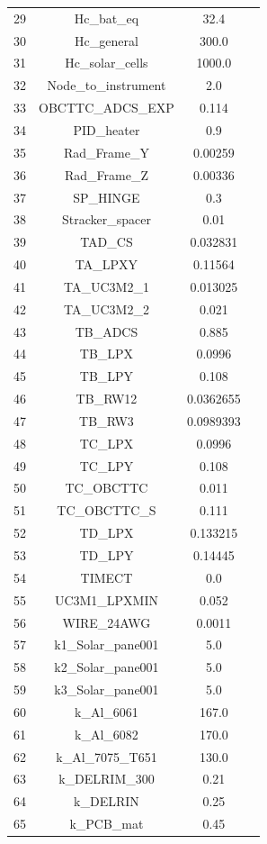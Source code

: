 \begin{table}[H]
\begin{tabular}{cccc}
        29 & Hc\_bat\_eq & 32.4 &  \\
        30 & Hc\_general & 300.0 &  \\
        31 & Hc\_solar\_cells & 1000.0 &  \\
        32 & Node\_to\_instrument & 2.0 &  \\
        33 & OBCTTC\_ADCS\_EXP & 0.114 &  \\
        34 & PID\_heater & 0.9 &  \\
        35 & Rad\_Frame\_Y & 0.00259 &  \\
        36 & Rad\_Frame\_Z & 0.00336 &  \\
        37 & SP\_HINGE & 0.3 &  \\
        38 & Stracker\_spacer & 0.01 &  \\
        39 & TAD\_CS & 0.032831 &  \\
        40 & TA\_LPXY & 0.11564 &  \\
        41 & TA\_UC3M2\_1 & 0.013025 &  \\
        42 & TA\_UC3M2\_2 & 0.021 &  \\
        43 & TB\_ADCS & 0.885 &  \\
        44 & TB\_LPX & 0.0996 &  \\
        45 & TB\_LPY & 0.108 &  \\
        46 & TB\_RW12 & 0.0362655 &  \\
        47 & TB\_RW3 & 0.0989393 &  \\
        48 & TC\_LPX & 0.0996 &  \\
        49 & TC\_LPY & 0.108 &  \\
        50 & TC\_OBCTTC & 0.011 &  \\
        51 & TC\_OBCTTC\_S & 0.111 &  \\
        52 & TD\_LPX & 0.133215 &  \\
        53 & TD\_LPY & 0.14445 &  \\
        54 & TIMECT & 0.0 &  \\
        55 & UC3M1\_LPXMIN & 0.052 &  \\
        56 & WIRE\_24AWG & 0.0011 &  \\
        57 & k1\_Solar\_pane001 & 5.0 &  \\
        58 & k2\_Solar\_pane001 & 5.0 &  \\
        59 & k3\_Solar\_pane001 & 5.0 &  \\
        60 & k\_Al\_6061 & 167.0 &  \\
        61 & k\_Al\_6082 & 170.0 &  \\
        62 & k\_Al\_7075\_T651 & 130.0 &  \\
        63 & k\_DELRIM\_300 & 0.21 &  \\
        64 & k\_DELRIN & 0.25 &  \\
        65 & k\_PCB\_mat & 0.45 &  \\
        \hline
        \end{tabular}
    \end{table}


